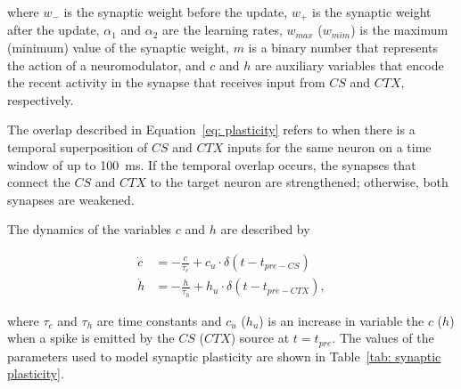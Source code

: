 where $w_-$ is the synaptic weight before the update, $w_+$ is the synaptic weight after the update, $\alpha_1$ and $\alpha_2$ are the learning rates, $w_{max}$ ($w_{mim}$) is the maximum (minimum) value of the synaptic weight, $m$ is a binary number that represents the action of a neuromodulator, and $c$ and $h$ are auxiliary variables that encode the recent activity in the synapse that receives input from $CS$ and $CTX$, respectively.

The overlap described in Equation~\ref{eq: plasticity} refers to when there is a temporal superposition of $CS$ and $CTX$ inputs for the same neuron on a time window of up to 100~ms. If the temporal overlap occurs, the synapses that connect the $CS$ and $CTX$ to the target neuron are strengthened; otherwise, both synapses are weakened. 

The dynamics of the variables $c$ and $h$ are described by

\begin{align}
    \dot{c} &= - \frac{c}{\tau_c} + c_u \cdot \delta(t - t_{pre-CS})
    \label{eq: c}
    \\
    \dot{h} &= - \frac{h}{\tau_h} + h_u \cdot \delta(t - t_{pre-CTX}),
    \label{eq: h}
\end{align}

where $\tau_c$ and $\tau_h$ are time constants and $c_u$ ($h_u$) is an increase in variable the $c$ ($h$) when a spike is emitted by the $CS$ ($CTX$) source at $t = t_{pre}$. The values of the parameters used to model synaptic plasticity are shown in Table~\ref{tab: synaptic plasticity}.


